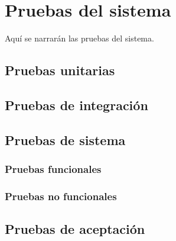 \chapter{Pruebas del sistema}
Aquí se narrarán las pruebas del sistema.

\section{Pruebas unitarias}


\section{Pruebas de integración}


\section{Pruebas de sistema}


\subsection{Pruebas funcionales}


\subsection{Pruebas no funcionales}


\section{Pruebas de aceptación}